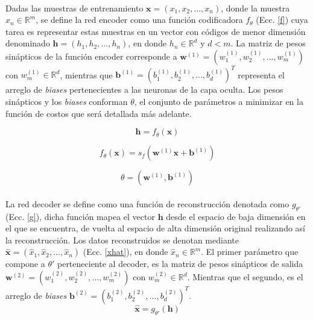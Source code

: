 \documentclass[12pt]{article}%
\begin{document}
\paragraph{}
Dadas las muestras de entrenamiento $\textbf{x}=(x_{1},x_{2},...,x_{n})$, donde la muestra $x_{n}\in \mathbb{R}^{m}$, se define la red encoder como una función codificadora $f_{\theta}$ (Ecc. \ref{f}) cuya tarea es representar estas muestras en un vector con códigos de menor dimensión denominado $\textbf{h}=(h_{1},h_{2},...,h_{n})$, en donde $h_{n} \in \mathbb{R}^{d}$ y $d<m$. La matriz de pesos sinápticos de la función encoder corresponde a $\textbf{w}^{(1)} = (w_{1}^{(1)},w_{2}^{(1)},...,w_{m}^{(1)})$ con $w_{m}^{(1)}\in \mathbb{R}^{d}$, mientras que $\textbf{b}^{(1)}=(b_{1}^{(1)},b_{2}^{(1)},...,b_{d}^{(1)})^T$ representa el arreglo de \textit{biases} pertenecientes a las neuronas de la capa oculta. Los pesos sinápticos y los \textit{biases} conforman $\theta$, el conjunto de parámetros a minimizar en la función de costos que será detallada más adelante.

\begin{equation}
\label{h}
\textbf{h}=f_{\theta}(\textbf{x})
\end{equation}

\begin{equation}
\label{f}
f_{\theta}(\textbf{x})=s_{f}(\textbf{w}^{(1)}\textbf{x}+\textbf{b}^{(1)})
\end{equation}

\begin{equation}
\label{teta1}
\theta=(\textbf{w}^{(1)},\textbf{b}^{(1)})
\end{equation}

\paragraph{}
La red decoder se define como una función de reconstrucción denotada como $g_{\theta'}$ (Ecc. \ref{g}), dicha función mapea el vector $\textbf{h}$ desde el espacio de baja dimensión en el que se encuentra, de vuelta al espacio de alta dimensión original realizando así la reconstrucción. Los datos reconstruidos se denotan mediante $\hat{\textbf{x}}=(\hat{x}_{1},\hat{x}_{2},...,\hat{x}_{n})$ (Ecc. \ref{xhat}), en donde $\hat{x}_{n}\in \mathbb{R}^{m}$. El primer parámetro que compone a $\theta'$ perteneciente al decoder, es la matriz de pesos sinápticos de salida $\textbf{w}^{(2)} = (w_{1}^{(2)},w_{2}^{(2)},...,w_{m}^{(2)})$ con $w_{m}^{(2)}\in \mathbb{R}^{d}$. Mientras que el segundo, es el arreglo de \textit{biases} $\textbf{b}^{(2)}=(b_{1}^{(2)},b_{2}^{(2)},...,b_{d}^{(2)})^T$. 
\begin{equation}
\label{xhat}
\hat{\textbf{x}}=g_{\theta'}(\textbf{h})
\end{equation}
\end{document}

